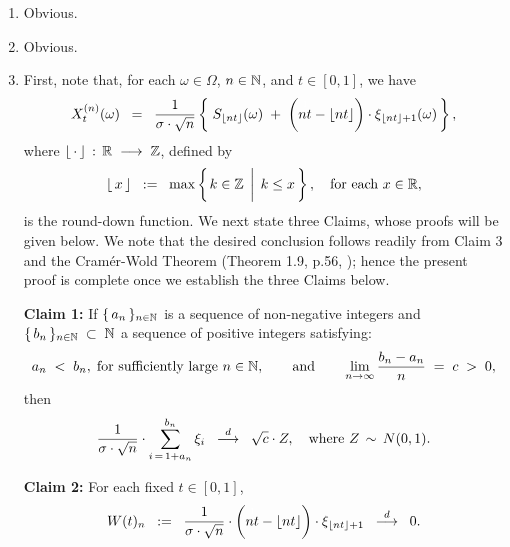 \begin{enumerate}
\item	Obvious.
\item	Obvious.
\item	First, note that, for each $\omega \in \Omega$, $n \in\mathbb{N}$, and $t \in [0,1]$, we have
		\begin{equation*}
		X^{(n)}_{t}(\omega)
		\;\; = \;\;
		\dfrac{1}{\sigma\cdot\sqrt{n}}
		\left\{\;
		S_{\lfloor nt \rfloor}(\omega) \;+\; \left(\overset{{\color{white}1}}{nt} - \lfloor nt \rfloor\right)\cdot\xi_{\lfloor nt \rfloor+1}(\omega)
		\,\right\},
		\end{equation*}
		where $\lfloor\,\cdot\,\rfloor\,:\,\mathbb{R}\;\longrightarrow\;\mathbb{Z}$, defined by
		\begin{equation*}
		\lfloor\,x\,\rfloor
		\;\;:=\;\;
		\max\left\{
		\left. k \in \overset{{\color{white}1}}{\Z} \,\;\right\vert\; k \leq x
		\,\right\},
		\quad
		\textnormal{for each $x \in \Re$},
		\end{equation*}
		is the round-down function.
		We next state three Claims, whose proofs will be given below.
		We note that the desired conclusion follows readily from Claim 3 and
		the Cram\'{e}r-Wold Theorem (Theorem 1.9, p.56, \cite{Shao2003});
		hence the present proof is complete once we establish the three
		Claims below.

		\vskip 0.5cm
		\begin{center}
		\begin{minipage}{6.0in}
		\noindent
		\textbf{Claim 1:}\quad
		If \;$\{\,a_{n}\,\}_{n\in\mathbb{N}}$\; is a sequence of non-negative integers and
		\;$\{\,b_{n}\,\}_{n\in\mathbb{N}} \;\subset\; \mathbb{N}$\; a sequence of positive integers
		satisfying:
		\begin{equation*}
		a_{n} \;<\; b_{n}, \;\textnormal{for sufficiently large $n\in\mathbb{N}$},
		\quad\quad
		\textnormal{and}
		\quad\quad
		\lim_{n\rightarrow\infty}\dfrac{b_{n} - a_{n}}{n} \;=\; c \;>\; 0,
		\end{equation*}
		then
		\begin{equation*}
		\dfrac{1}{\sigma\cdot\sqrt{n}}\cdot\sum_{i\,=\,1+a_{n}}^{b_{n}}\xi_{i}
		\;\; \overset{d}{\longrightarrow} \;\;
		\sqrt{c}\cdot Z,
		\quad
		\textnormal{where $Z\,\sim\,N(0,1)$}.
		\end{equation*}
		\end{minipage}
		\end{center}

		\vskip 0.5cm
		\begin{center}
		\begin{minipage}{6.0in}
		\noindent
		\textbf{Claim 2:}
		\quad For each fixed $t \in [0,1]$,
		\begin{equation*}
		W(t)_{n} \;\; := \;\;
		\dfrac{1}{\sigma\cdot\sqrt{n}}
		\cdot
		\left(\overset{{\color{white}1}}{nt} - \lfloor nt \rfloor\right)
		\cdot
		\xi_{\lfloor nt \rfloor + 1}
		\;\; \overset{d}{\longrightarrow} \;\;
		0.
		\end{equation*}
		\end{minipage}
		\end{center}


\end{enumerate}

